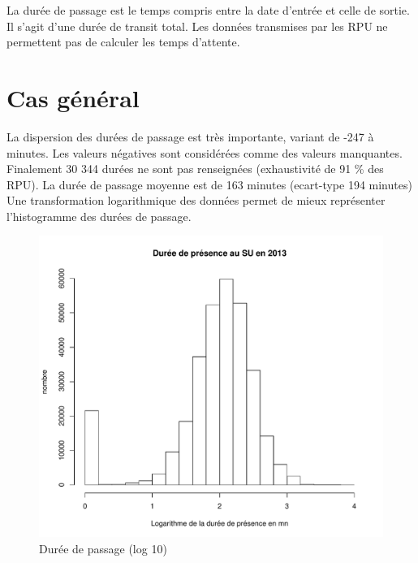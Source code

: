 \documentclass[12pt,english,french,twoside]{book}\usepackage[]{graphicx}\usepackage[]{color}
\makeatletter
\def\maxwidth{ %
  \ifdim\Gin@nat@width>\linewidth
    \linewidth
  \else
    \Gin@nat@width
  \fi
}
\newenvironment{knitrout}{}{} %
\makeatother
\begin{document}

La durée de passage est le temps compris entre la date d'entrée et celle de sortie. Il s'agit d'une durée de transit total. Les données transmises par les RPU ne permettent pas de calculer les temps d'attente.


\section{Cas général}




La dispersion des durées de passage est très importante, variant de -247 à  minutes. Les valeurs négatives sont considérées comme des valeurs manquantes. 
Finalement 30 344 durées ne sont pas renseignées (exhaustivité de 91 \% des RPU). 
La durée de passage moyenne est de 163 minutes (ecart-type 194 minutes)
Une transformation logarithmique des données permet de mieux représenter l'histogramme des durées de passage. 

\begin{figure}[ht!]
 \centering
\begin{knitrout}
\color{fgcolor}
\includegraphics[width=\maxwidth]{figure/log_passages} 

\end{knitrout}

 \caption{Durée de passage (log 10)}
\end{figure}
\end{document}
